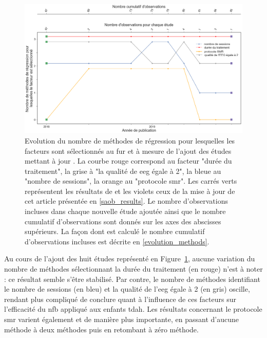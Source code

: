 \begin{figure}[h!]
  \centering
	\includegraphics[width=1\linewidth]{figures/chapter-3/factors-evolution-with-update} 
  \caption[Evolution du nombre de méthodes de régression pour lesquelles les facteurs sont sélectionnés au fur et à mesure de l'ajout de nouvelles études.]{Evolution du nombre de méthodes de régression pour lesquelles les facteurs sont sélectionnés au fur et à mesure de l'ajout des études mettant à jour \citet{Bussalb2019clinical}.
	La courbe rouge correspond au facteur "durée du traitement", la grise à "la qualité de \gls{eeg} égale à 2", la bleue au "nombre de sessions", la orange au "protocole \gls{smr}". 
	Les carrés verts représentent les résultats de \citet{Bussalb2019clinical} et les violets ceux de la mise à jour de cet article présentée en \ref{saob_results}.
	Le nombre d'observations incluses dans chaque nouvelle étude ajoutée ainsi que le nombre cumulatif d'observations sont donnés sur les axes des abscisses supérieurs.
	La façon dont est calculé le nombre cumulatif d'observations incluses est décrite en \ref{evolution_methods}.}
  \label{Figure:factors_evolution_with_update}
\end{figure}

Au cours de l'ajout des huit études représenté en Figure~\ref{Figure:factors_evolution_with_update}, aucune variation du nombre de méthodes sélectionnant la durée du traitement (en rouge) 
n'est à noter :
ce résultat semble s'être stabilisé. Par contre, le nombre de méthodes identifiant le nombre de sessions (en bleu) et la qualité de l'\gls{eeg} égale à 2 (en gris) oscille, rendant plus 
compliqué de conclure quant à l'influence de ces facteurs sur l'efficacité du \gls{nfb} appliqué aux enfants \gls{tdah}. Les résultats concernant le protocole \gls{smr} varient
également et de manière plus importante, en passant d'aucune méthode à deux méthodes puis en retombant à zéro méthode.

